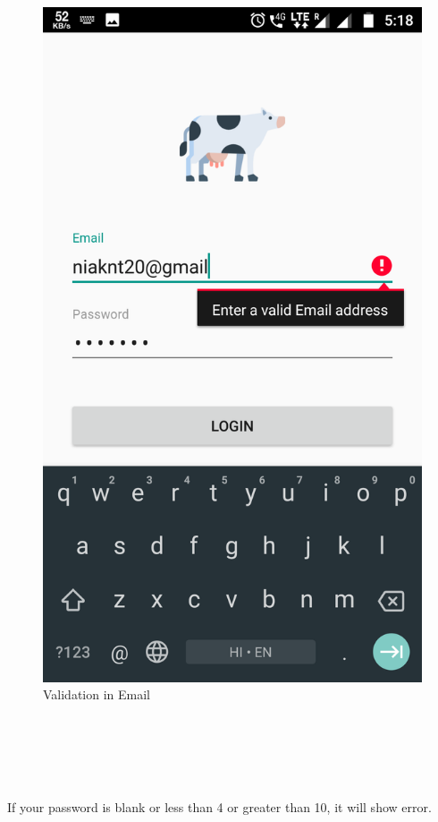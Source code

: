 \begin{figure}[h]
	\centering
	\includegraphics[width=0.7\linewidth]{s04}
	\caption{Validation in Email}
\end{figure}
\begin{text}
	\\
	\\
	\\
	\\
\end{text}
If your password is blank or less than 4 or greater than 10, it will show error.
